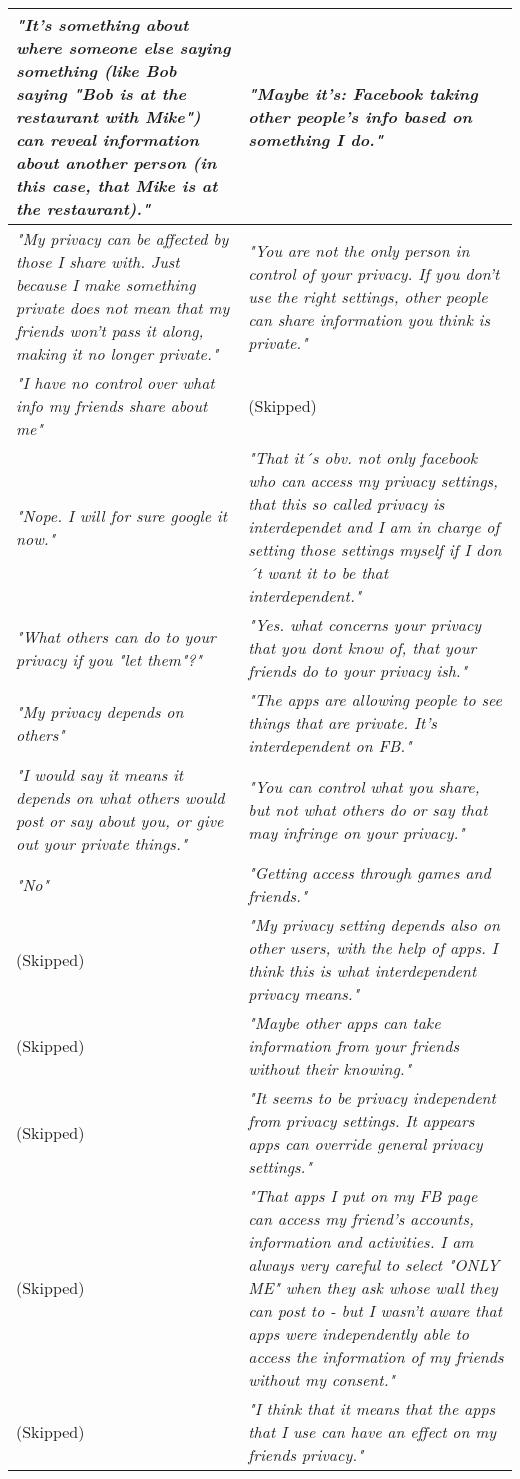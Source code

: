\begin{center}
\begin{longtable}{ | p{6cm} | p{6cm} |}
    \hline
\textit{"It's something about where someone else saying something (like Bob saying "Bob is at the restaurant with Mike") can reveal information about another person (in this case, that Mike is at the restaurant)."} & \textit{"Maybe it's: Facebook taking other people's info based on something I do."} \\
    \hline
   \textit{ "My privacy can be affected by those I share with. Just because I make something private does not mean that my friends won't pass it along, making it no longer private."} & \textit{"You are not the only person in control of your privacy. If you don't use the right settings, other people can share information you think is private."}\\ 
    \hline  
\textit{"I have no control over what info my friends share about me"} & (Skipped) \\
    \hline
\textit{"Nope. I will for sure google it now."} & \textit{"That it´s obv. not only facebook who can access my privacy settings, that this so called privacy is interdependet and I am in charge of setting those settings myself if I don´t want it to be that interdependent."} \\
    \hline
\textit{"What others can do to your privacy if you "let them"?"} & \textit{"Yes. what concerns your privacy that you dont know of, that your friends do to your privacy ish."}\\ 
    \hline  
\textit{"My privacy depends on others"} & \textit{"The apps are allowing people to see things that are private. It's interdependent on FB."}\\ 
    \hline
\textit{"I would say it means it depends on what others would post or say about you, or give out your private things."} & \textit{"You can control what you share, but not what others do or say that may infringe on your privacy."}\\ 
    \hline 
\textit{"No"} & \textit{"Getting access through games and friends."} \\ 
    \hline
(Skipped) & \textit{"My privacy setting depends also on other users, with the help of apps. I think this is what interdependent privacy means."}\\ 
    \hline
(Skipped) & \textit{"Maybe other apps can take information from your friends without their knowing."}\\ 
    \hline    
(Skipped) & \textit{"It seems to be privacy independent from privacy settings. It appears apps can override general privacy settings."}\\ 
     \hline
(Skipped) & \textit{"That apps I put on my FB page can access my friend's accounts, information and activities. I am always very careful to select "ONLY ME" when they ask whose wall they can post to - but I wasn't aware that apps were independently able to access the information of my friends without my consent."}\\ 
     \hline 
(Skipped) & \textit{"I think that it means that the apps that I use can have an effect on my friends privacy."}\\ 
     \hline     
    \end{longtable}
\end{center}

